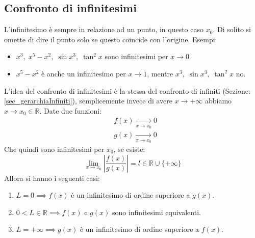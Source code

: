 \subsection{Confronto di infinitesimi}
L'infinitesimo è sempre in relazione ad un punto, in questo caso $x_0$. Di solito si omette di dire il punto solo se questo coincide con l'origine. Esempi:
\begin{itemize}
	\item $x^3,\; x^5 - x^2,\; \sin{x^3},\; \tan^2{x}$ sono infinitesimi per $x \to 0$
	
	\item $x^5 - x^2$ è anche un infinitesimo per $x \to 1$, mentre $x^3,\; \sin{x^3},\; \tan^2{x}$ no.
\end{itemize}

L'idea del confronto di infinitesimi è la stessa del confronto di infiniti (Sezione: \ref{sec_gerarchiaInfiniti}), semplicemente invece di avere $x \to +\infty$ abbiamo $x \to x_0 \in \mathbb{R}$. Date due funzioni:
\begin{align*}
	&f(x) \xrightarrow[x \to x_0]{} 0\\
	&g(x) \xrightarrow[x \to x_0]{} 0
\end{align*}
Che quindi sono infinitesimi per $x_0$, se esiste:
\begin{equation*}
	\lim_{x \to x_0} \left| \dfrac{f(x)}{g(x)} \right| = l \in \mathbb{R} \cup \{+\infty\}
\end{equation*}
Allora si hanno i seguenti casi:
\begin{enumerate}
	\item $L = 0 \implies f(x)$ è un infinitesimo di ordine superiore a $g(x)$.

	\item $0 < L \in \mathbb{R} \implies f(x)$ e $g(x)$ sono infinitesimi equivalenti.

	\item $L = +\infty \implies g(x)$ è un infinitesimo di ordine superiore a $f(x)$.
\end{enumerate}

